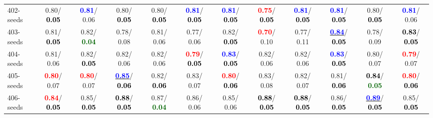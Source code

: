 \begin{table}[h]
\begin{center}
{\begin{tabular}{lc|c|c|c|c|c|c|c|c|c|c}
402-seeds &   0.80/\textcolor{black}{\textbf{  0.05}} & \textcolor{blue}{\textbf{  0.81}}/  0.06 &   0.80/\textcolor{black}{\textbf{  0.05}} &   0.80/\textcolor{black}{\textbf{  0.05}} & \textcolor{blue}{\textbf{  0.81}}/\textcolor{black}{\textbf{  0.05}} & \textcolor{blue}{\textbf{  0.81}}/\textcolor{black}{\textbf{  0.05}} & \textcolor{red}{\textbf{  0.75}}/\textcolor{black}{\textbf{  0.05}} & \textcolor{blue}{\textbf{  0.81}}/\textcolor{black}{\textbf{  0.05}} & \textcolor{blue}{\textbf{  0.81}}/\textcolor{black}{\textbf{  0.05}} &   0.80/\textcolor{black}{\textbf{  0.05}} & \textcolor{blue}{\textbf{  0.81}}/  0.06 \\
403-seeds &   0.81/\textcolor{black}{\textbf{  0.05}} &   0.82/\textcolor{darkgreen}{\textbf{  0.04}} &   0.78/  0.08 &   0.81/  0.06 &   0.77/  0.06 &   0.82/\textcolor{black}{\textbf{  0.05}} & \textcolor{red}{\textbf{  0.70}}/  0.10 &   0.77/  0.11 & \underline{\textcolor{blue}{\textbf{  0.84}}}/\textcolor{black}{\textbf{  0.05}} &   0.78/  0.09 & \textcolor{black}{\textbf{  0.83}}/\textcolor{black}{\textbf{  0.05}} \\
404-seeds &   0.81/  0.06 &   0.82/\textcolor{black}{\textbf{  0.05}} &   0.82/  0.06 &   0.82/  0.06 & \textcolor{red}{\textbf{  0.79}}/\textcolor{black}{\textbf{  0.05}} & \textcolor{blue}{\textbf{  0.83}}/\textcolor{black}{\textbf{  0.05}} &   0.82/  0.06 &   0.82/  0.06 & \textcolor{blue}{\textbf{  0.83}}/\textcolor{black}{\textbf{  0.05}} &   0.80/  0.07 & \textcolor{red}{\textbf{  0.79}}/  0.07 \\
405-seeds & \textcolor{red}{\textbf{  0.80}}/  0.07 & \textcolor{red}{\textbf{  0.80}}/  0.07 & \underline{\textcolor{blue}{\textbf{  0.85}}}/\textcolor{black}{\textbf{  0.06}} &   0.82/\textcolor{black}{\textbf{  0.06}} &   0.83/  0.07 & \textcolor{red}{\textbf{  0.80}}/\textcolor{black}{\textbf{  0.06}} &   0.83/  0.08 &   0.82/  0.07 &   0.81/\textcolor{black}{\textbf{  0.06}} & \textcolor{black}{\textbf{  0.84}}/\textcolor{darkgreen}{\textbf{  0.05}} & \textcolor{red}{\textbf{  0.80}}/\textcolor{black}{\textbf{  0.06}} \\ \hline
406-seeds & \textcolor{red}{\textbf{  0.84}}/\textcolor{black}{\textbf{  0.05}} &   0.85/\textcolor{black}{\textbf{  0.05}} & \textcolor{black}{\textbf{  0.88}}/\textcolor{black}{\textbf{  0.05}} &   0.87/\textcolor{darkgreen}{\textbf{  0.04}} &   0.86/  0.06 &   0.85/  0.06 & \textcolor{black}{\textbf{  0.88}}/\textcolor{black}{\textbf{  0.05}} & \textcolor{black}{\textbf{  0.88}}/\textcolor{black}{\textbf{  0.05}} &   0.86/\textcolor{black}{\textbf{  0.05}} & \underline{\textcolor{blue}{\textbf{  0.89}}}/\textcolor{black}{\textbf{  0.05}} &   0.85/\textcolor{black}{\textbf{  0.05}} \\

\end{tabular}}
\end{center}
\end{table}
